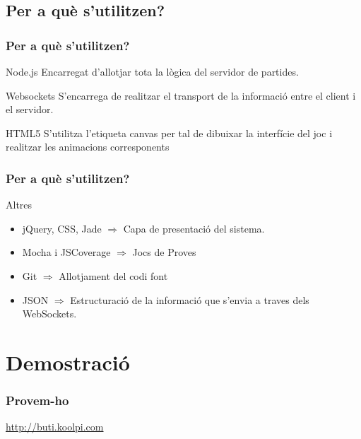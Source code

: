 \documentclass[notitlepage]{beamer}
\begin{document}
\subsection{Per a què s'utilitzen?}
\begin{frame}
\frametitle{Per a què s'utilitzen?}
\begin{block}{Node.js}
Encarregat d'allotjar tota la lògica del servidor de partides.
\end{block}

\begin{block}{Websockets}
S'encarrega de realitzar el transport de la informació entre el client i el servidor.
\end{block}

\begin{block}{HTML5}
S'utilitza l'etiqueta canvas per tal de dibuixar la interfície del joc i realitzar les animacions corresponents
\end{block}
\end{frame}

\begin{frame}
\frametitle{Per a què s'utilitzen?}
\begin{block}{Altres}
\begin{itemize}
    \item{jQuery, CSS, Jade $\Rightarrow$  Capa de presentació del sistema.}
    \item{Mocha i JSCoverage $\Rightarrow$ Jocs de Proves}
    \item{Git $\Rightarrow$  Allotjament del codi font}
    \item{JSON $\Rightarrow$  Estructuració de la informació que s'envia a traves dels WebSockets.}
\end{itemize}
\end{block}
\end{frame}


\section{Demostració}
\begin{frame}
\frametitle{Provem-ho}
\begin{center}
\url{http://buti.koolpi.com}
\end{center}
\end{frame}
\end{document}
